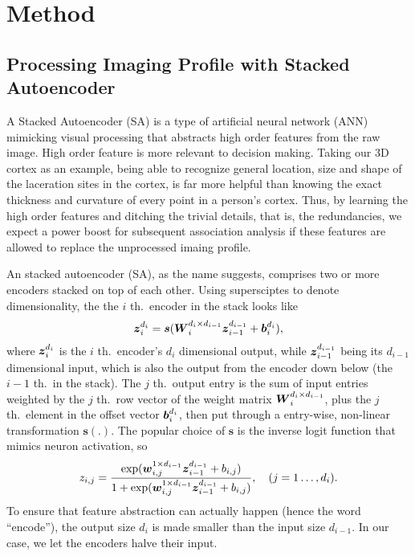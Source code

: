 \section{Method}

\subsection{Processing Imaging Profile with Stacked Autoencoder}
A Stacked Autoencoder (SA) is a type of artificial neural network (ANN) mimicking visual processing that abstracts high order features from the raw image. High order feature is more relevant to decision making. Taking our 3D cortex as an example, being able to recognize general location, size and shape of the laceration sites in the cortex, is far more helpful than knowing the exact thickness and curvature of every point in a person's cortex. Thus, by learning the high order features and ditching the trivial details, that is, the redundancies, we expect a power boost for subsequent association analysis if these features are allowed to replace the unprocessed imaing profile.

An stacked autoencoder (SA), as the name suggests, comprises two or more encoders stacked on top of each other. Using supersciptes to denote dimensionality, the the $i$ th.\ encoder in the stack looks like
\begin{equation} \label{eq:AE}
  \boldsymbol{z}_i^{d_i} = \boldsymbol{s}(\boldsymbol{W}_{i}^{d_{i} \times d_{i-1}} \boldsymbol{z}_{i-1}^{d_{i-1}} + \boldsymbol{b}_{i}^{d_{i}}),
\end{equation}
where $\boldsymbol{z}_{i}^{d_{i}}$ is the $i$ th.\ encoder's $d_i$ dimensional output, while $\boldsymbol{z}_{i-1}^{d_{i-1}}$ being its $d_{i-1}$ dimensional input, which is also the output from the encoder down below (the $i-1$ th.\ in the stack). The $j$ th.\ output entry is the sum of input entries weighted by the $j$ th.\ row vector of the weight matrix $\boldsymbol{W}_{i}^{d_{i} \times d_{i-1}}$, plus the $j$ th.\ element in the offset vector $\boldsymbol{b}_{i}^{d_{i}}$, then put through a entry-wise, non-linear transformation $\boldsymbol{s}(.)$. The popular choice of $\boldsymbol{s}$ is the inverse logit function that mimics neuron activation, so
\[z_{i,j} = \frac{\exp({\boldsymbol{w}_{i,j}^{1 \times d_{i-1}}} \boldsymbol{z}_{i-1}^{d_{i-1}} + b_{i,j})}{1 + \exp({\boldsymbol{w}_{i,j}^{1 \times d_{i-1}}} \boldsymbol{z}_{i-1}^{d_{i-1}} + b_{i,j})}, \quad (j=1 \dots, d_i). \]
To ensure that feature abstraction can actually happen (hence the word ``encode''), the output size $d_i$ is made smaller than the input size $d_{i-1}$. In our case, we let the encoders halve their input.

